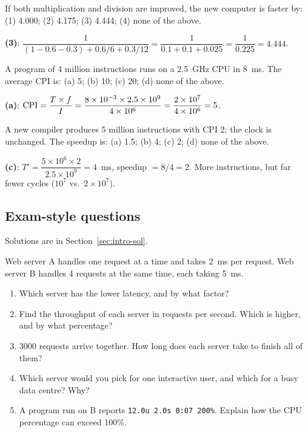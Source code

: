 \begin{exercise}[Lecturer 2]
If both multiplication and division are improved, the new computer is faster by:
(1) 4.000; (2) 4.175; (3) 4.444; (4) none of the above.
\end{exercise}
\begin{solution}
\textbf{(3)}: $\dfrac{1}{(1-0.6-0.3)+0.6/6+0.3/12}=\dfrac{1}{0.1+0.1+0.025}
=\dfrac{1}{0.225}=4.444$.
\end{solution}

\begin{exercise}[Lecturer 3]
A program of 4 million instructions runs on a 2.5~GHz CPU in 8~ms. The average CPI
is: (a) 5; (b) 10; (c) 20; (d) none of the above.
\end{exercise}
\begin{solution}
\textbf{(a)}: $\mathrm{CPI}=\dfrac{T\times f}{I}=\dfrac{8\times10^{-3}\times2.5\times10^9}
{4\times10^6}=\dfrac{2\times10^7}{4\times10^6}=5$.
\end{solution}

\begin{exercise}[Lecturer 4]
A new compiler produces 5 million instructions with CPI 2; the clock is unchanged.
The speedup is: (a) 1.5; (b) 4; (c) 2; (d) none of the above.
\end{exercise}
\begin{solution}
\textbf{(c)}: $T'=\dfrac{5\times10^6\times2}{2.5\times10^9}=4$~ms, speedup
$=8/4=2$. More instructions, but far fewer cycles ($10^7$ vs.\ $2\times10^7$).
\end{solution}

\subsection{Exam-style questions}
Solutions are in Section~\ref{sec:intro-sol}.

\begin{exercise}\label{q:intro-lat}
Web server A handles one request at a time and takes 2~ms per request. Web
server B handles 4 requests at the same time, each taking 5~ms.
\begin{enumerate}[label=(\alph*),leftmargin=*]
  \item Which server has the lower latency, and by what factor?
  \item Find the throughput of each server in requests per second. Which is
  higher, and by what percentage?
  \item 3000 requests arrive together. How long does each server take to finish
  all of them?
  \item Which server would you pick for one interactive user, and which for a
  busy data centre? Why?
  \item A program run on B reports \texttt{12.0u 2.0s 0:07 200\%}. Explain how
  the CPU percentage can exceed 100\%.
\end{enumerate}
\end{exercise}

